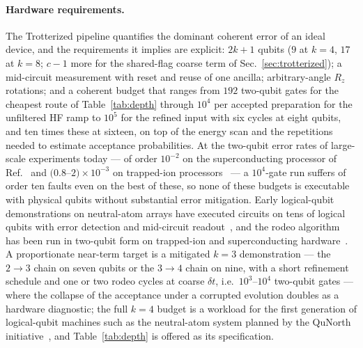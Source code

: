 \documentclass[
  aps,            %
  prc,            %
  reprint,        %
  superscriptaddress,
  floatfix,
  nofootinbib
]{revtex4-2}
\begin{document}
\paragraph{Hardware requirements.}
The Trotterized pipeline quantifies the dominant coherent error of an ideal
device, and the requirements it implies are explicit: $2k+1$ qubits ($9$ at
$k=4$, $17$ at $k=8$; $c-1$ more for the shared-flag coarse term of
Sec.~\ref{sec:trotterized}); a mid-circuit measurement with reset and reuse
of one ancilla; arbitrary-angle $R_z$ rotations; and a coherent budget that
ranges from $192$ two-qubit gates for the cheapest route of
Table~\ref{tab:depth} through $10^{4}$ per accepted preparation for the
unfiltered HF ramp to $10^{5}$ for the refined input with six cycles at eight qubits,
and ten times these at sixteen, on top of the energy scan and the
repetitions needed to estimate acceptance probabilities.  At the two-qubit
error rates of large-scale experiments today --- of order $10^{-2}$ on the
superconducting processor of Ref.~\cite{Kim2023} and $(0.8$--$2)\times10^{-3}$
on trapped-ion processors~\cite{Moses2023,Ransford2025} --- a $10^{4}$-gate
run suffers of order ten faults even on the best of these, so none of
these budgets is executable with physical qubits without substantial error
mitigation.  Early logical-qubit demonstrations on neutral-atom arrays have
executed circuits on tens of logical qubits with error detection and
mid-circuit readout~\cite{Bluvstein2024,Reichardt2024}, and the rodeo
algorithm has been run in two-qubit form on trapped-ion and superconducting
hardware~\cite{BeeLindgren2022,Qian2024}.  A proportionate near-term target
is a mitigated $k=3$ demonstration --- the $2\to3$ chain on seven qubits or
the $3\to4$ chain on nine, with a short refinement schedule and one or two
rodeo cycles at coarse $\delta t$, i.e.\ $10^{3}$--$10^{4}$ two-qubit gates
--- where the collapse of the acceptance under a corrupted evolution doubles
as a hardware diagnostic; the full $k=4$ budget is a workload for the first
generation of logical-qubit machines such as the neutral-atom system planned
by the QuNorth initiative~\cite{QuNorth}, and Table~\ref{tab:depth} is
offered as its specification.
\end{document}
